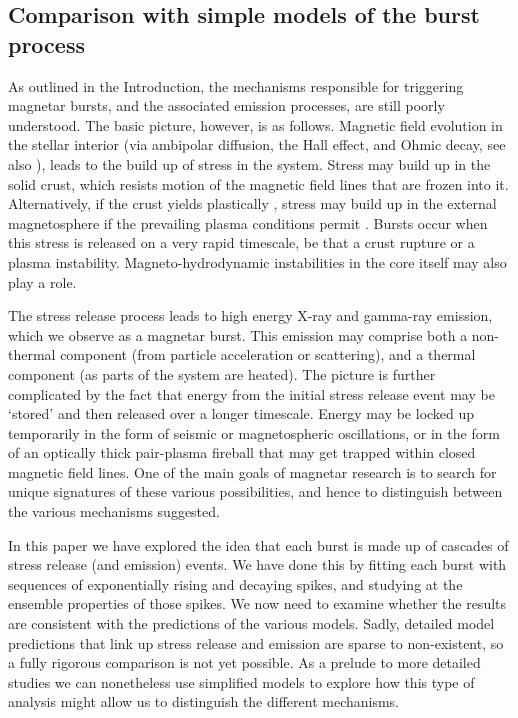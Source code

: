 \documentclass[12pt]{emulateapj}
\begin{document}
\subsection{Comparison with simple models of the burst process}
As outlined in the Introduction, the mechanisms responsible for triggering magnetar bursts, and the associated emission processes,
 are still poorly understood. The basic picture, however, is as follows. Magnetic field evolution in the stellar interior (via ambipolar diffusion,  the Hall effect, and Ohmic decay, see also \citealt{goldreich1992}), leads to the build up of stress in the system. Stress may build up in the solid crust, which resists motion of the 
 magnetic field lines that are frozen into it. Alternatively, if the crust yields plastically \citep{jones2003,levin2012}, stress may build up in the external magnetosphere if the 
 prevailing plasma conditions permit \citep{beloborodov2014}. Bursts occur when this stress is released on a very rapid timescale, be that a crust rupture or a plasma instability. 
 Magneto-hydrodynamic instabilities in the core itself may also play a role.

The stress release process leads to high energy X-ray and gamma-ray emission, which we observe as a magnetar burst. This emission may comprise 
both a non-thermal component (from particle acceleration or scattering), and a thermal component (as parts of the system are heated). The picture is 
further complicated by the fact that energy from the initial stress release event may be `stored' and then released over a longer timescale. Energy may 
be locked up temporarily in the form of seismic or magnetospheric oscillations, or in the form of an optically thick pair-plasma fireball that may get trapped
 within closed magnetic field lines. One of the main goals of magnetar research is to search for unique signatures of these various possibilities, and hence 
 to distinguish between the various mechanisms suggested.

In this paper we have explored the idea that each burst is made up of cascades of stress release (and emission) events. We have done this by fitting each 
burst with sequences of exponentially rising and decaying spikes, and studying at the ensemble properties of those spikes. We now need to examine whether 
the results are consistent with the predictions of the various models. Sadly, detailed model predictions that link up stress release and emission are sparse to 
non-existent, so a fully rigorous comparison is not yet possible. As a prelude to more detailed studies we can nonetheless use simplified models to explore 
how this type of analysis might allow us to distinguish the different mechanisms.
\end{document}
